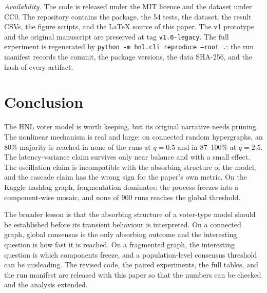 \documentclass[conference]{IEEEtran}
\begin{document}
\emph{Availability.} The code is released under the MIT licence and the dataset under CC0. The repository contains the package, the 54 tests, the dataset, the result CSVs, the figure scripts, and the LaTeX source of this paper. The v1 prototype and the original manuscript are preserved at tag \texttt{v1.0-legacy}. The full experiment is regenerated by \texttt{python -m hnl.cli reproduce --root .}; the run manifest records the commit, the package versions, the data SHA-256, and the hash of every artifact.

\section{Conclusion}

The HNL voter model is worth keeping, but its original narrative needs pruning. The nonlinear mechanism is real and large: on connected random hypergraphs, an 80\% majority is reached in none of the runs at $q=0.5$ and in 87--100\% at $q=2.5$. The latency-variance claim survives only near balance and with a small effect. The oscillation claim is incompatible with the absorbing structure of the model, and the cascade claim has the wrong sign for the paper's own metric. On the Kaggle hashtag graph, fragmentation dominates: the process freezes into a component-wise mosaic, and none of 900 runs reaches the global threshold.

The broader lesson is that the absorbing structure of a voter-type model should be established before its transient behaviour is interpreted. On a connected graph, global consensus is the only absorbing outcome and the interesting question is how fast it is reached. On a fragmented graph, the interesting question is which components freeze, and a population-level consensus threshold can be misleading. The revised code, the paired experiments, the full tables, and the run manifest are released with this paper so that the numbers can be checked and the analysis extended.

\appendices
\end{document}
